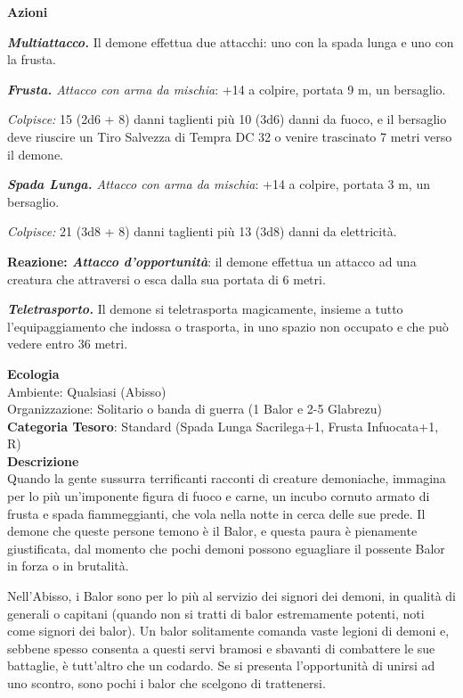 \begin{multicols}{2}
{\textbf{Azioni}

\emph{\textbf{Multiattacco.}} Il demone effettua due attacchi: uno con la spada lunga e uno con la frusta.

\emph{\textbf{Frusta.} Attacco con arma da mischia}: +14 a colpire, portata 9 m, un bersaglio.

\emph{Colpisce:} 15 (2d6 + 8) danni taglienti più 10 (3d6) danni da fuoco, e il bersaglio deve riuscire un Tiro Salvezza di Tempra DC 32 o venire trascinato 7 metri verso il demone.

\emph{\textbf{Spada Lunga.} Attacco con arma da mischia}: +14 a colpire, portata 3 m, un bersaglio.

\emph{Colpisce:} 21 (3d8 + 8) danni taglienti più 13 (3d8) danni da elettricità.

\textbf{Reazione: \emph{Attacco d'opportunità}}: il demone effettua un attacco ad una creatura che attraversi o esca dalla sua portata di 6 metri.

\emph{\textbf{Teletrasporto.}} Il demone si teletrasporta magicamente, insieme a tutto l'equipaggiamento che indossa o trasporta, in uno spazio non occupato e che può vedere entro 36 metri.

\textbf{Ecologia}\\
Ambiente: Qualsiasi (Abisso)\\
Organizzazione: Solitario o banda di guerra (1 Balor e 2-5 Glabrezu)\\
\textbf{Categoria Tesoro}: Standard (Spada Lunga Sacrilega+1, Frusta Infuocata+1, R)\\
\textbf{Descrizione}\\
Quando la gente sussurra terrificanti racconti di creature demoniache, immagina per lo più un'imponente figura di fuoco e carne, un incubo cornuto armato di frusta e spada fiammeggianti, che vola nella notte in cerca delle sue prede. Il demone che queste persone temono è il Balor, e questa paura è pienamente giustificata, dal momento che pochi demoni possono eguagliare il possente Balor in forza o in brutalità.

Nell'Abisso, i Balor sono per lo più al servizio dei signori dei demoni, in qualità di generali o capitani (quando non si tratti di balor estremamente potenti, noti come signori dei balor). Un balor solitamente comanda vaste legioni di demoni e, sebbene spesso consenta a questi servi bramosi e sbavanti di combattere le sue battaglie, è tutt'altro che un codardo. Se si presenta l'opportunità di unirsi ad uno scontro, sono pochi i balor che scelgono di trattenersi.

}
\end{multicols}
